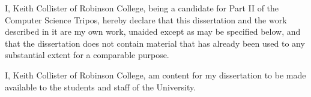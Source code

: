 \documentclass[dissertation.tex]{subfiles}
\begin{document}
I, Keith Collister of Robinson College, being a candidate for Part II of the Computer Science Tripos, hereby declare
that this dissertation and the work described in it are my own work, unaided except as may be specified below, and that
the dissertation does not contain material that has already been used to any substantial extent for a comparable
purpose.

I, Keith Collister of Robinson College, am content for my dissertation to be made available to the students and staff of
the University. 

\bigskip
{}

\medskip
{}
\end{document}
